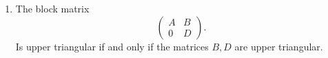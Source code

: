 \documentclass{article}
\begin{document}
\begin{enumerate} 

  \item The block matrix
    \[
      \begin{pmatrix} A &B\\ 0&D\end{pmatrix} 
    .\] 
    Is upper triangular if and only if the matrices $B,D$ are upper triangular. 

\end{enumerate}
\end{document}
